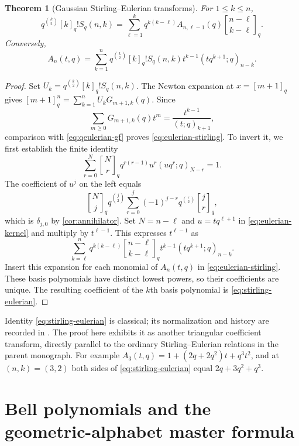 \documentclass[11pt,a4paper]{article}
\numberwithin{equation}{section}
\newtheorem{theorem}{Theorem}[section]
\theoremstyle{definition}
\theoremstyle{remark}
\newcommand{\G}[2]{\genfrac{[}{]}{0pt}{}{#1}{#2}_{q}}
\newcommand{\qfac}[1]{[#1]_q!}
\begin{document}
\begin{theorem}[Gaussian Stirling--Eulerian transforms]
\label{thm:stirling-eulerian}
For $1\le k\le n$,
\begin{equation}
 q^{\binom k2}\qfac k S_q(n,k)
 =\sum_{\ell=1}^k q^{k(k-\ell)}A_{n,\ell-1}(q)
       \G{n-\ell}{k-\ell}.
 \label{eq:stirling-eulerian}
\end{equation}
Conversely,
\begin{equation}
 A_n(t,q)=\sum_{k=1}^n
 q^{\binom k2}\qfac kS_q(n,k)
       t^{k-1}(tq^{k+1};q)_{n-k}.
 \label{eq:eulerian-stirling}
\end{equation}
\end{theorem}
\begin{proof}
Set $U_k=q^{\binom k2}\qfac kS_q(n,k)$. The Newton expansion at
$x=[m+1]_q$ gives
$[m+1]_q^n=\sum_{k=1}^nU_kG_{m+1,k}(q)$.
Since
\[
 \sum_{m\ge0}G_{m+1,k}(q)t^m=\frac{t^{k-1}}{(t;q)_{k+1}},
\]
comparison with \cref{eq:qeulerian-gf} proves
\cref{eq:eulerian-stirling}.
To invert it, we first establish the finite identity
\begin{equation}
 \sum_{r=0}^N\G Nr q^{r(r-1)}u^r(uq^r;q)_{N-r}=1.
 \label{eq:eulerian-kernel}
\end{equation}
The coefficient of $u^j$ on the left equals
\[
 \G Nj q^{\binom j2}
   \sum_{r=0}^j(-1)^{j-r}q^{\binom r2}\G jr,
\]
which is $\delta_{j,0}$ by \cref{cor:annihilator}. Set
$N=n-\ell$ and $u=tq^{\ell+1}$ in \cref{eq:eulerian-kernel} and
multiply by $t^{\ell-1}$. This expresses $t^{\ell-1}$ as
\[
 \sum_{k=\ell}^n q^{k(k-\ell)}\G{n-\ell}{k-\ell}
          t^{k-1}(tq^{k+1};q)_{n-k}.
\]
Insert this expansion for each monomial of $A_n(t,q)$ in
\cref{eq:eulerian-stirling}. These basis polynomials have distinct
lowest powers, so their coefficients are unique. The resulting
coefficient of the $k$th basis polynomial is \cref{eq:stirling-eulerian}.
\end{proof}
Identity \cref{eq:stirling-eulerian} is classical; its normalization and
history are recorded in \cite{dingzeng}. The proof here exhibits it as
another triangular coefficient transform, directly parallel to the
ordinary Stirling--Eulerian relations in the parent monograph.
For example $A_3(t,q)=1+(2q+2q^2)t+q^3t^2$, and at $(n,k)=(3,2)$
both sides of \cref{eq:stirling-eulerian} equal
$2q+3q^2+q^3$.

\section{Bell polynomials and the geometric-alphabet master formula}
\label{sec:bell}
\end{document}
